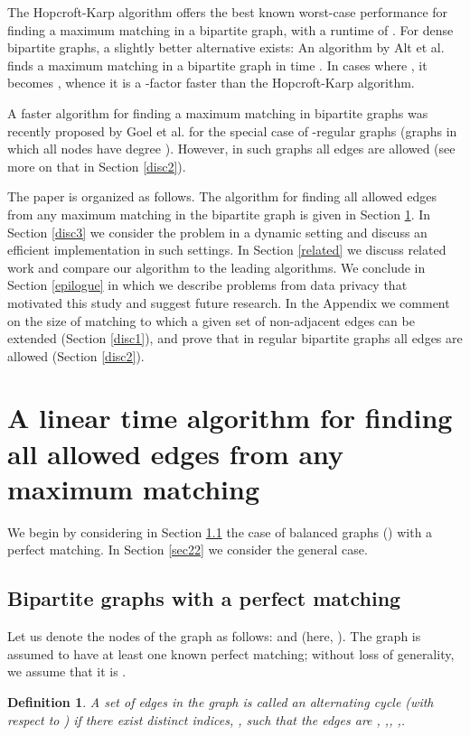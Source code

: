 \documentclass[times, 11pt]{article}
\newtheorem{definition}[theorem]{Definition}
\begin{document}
The Hopcroft-Karp algorithm \cite{HK} offers the best known worst-case performance for finding a maximum matching
in a bipartite graph, with a runtime of .
For dense bipartite graphs, a slightly better alternative exists:
An algorithm by Alt et al. \cite{ABMP} finds a maximum matching in a bipartite graph in time
. In cases where
, it becomes
, whence it is a -factor faster than the Hopcroft-Karp algorithm.

A faster algorithm for finding a maximum matching in bipartite graphs was recently proposed by Goel et al. \cite{GKK10} for the special case
of -regular graphs (graphs in which all nodes have degree ). However, in such graphs all edges are allowed (see more on that in
Section \ref{disc2}).

The paper is organized as follows. The algorithm for finding all allowed edges from any maximum matching in the bipartite graph is given in Section \ref{sec2}.
In Section \ref{disc3} we consider the problem in a dynamic setting and discuss an efficient implementation in such settings.
In Section \ref{related} we discuss related work and compare our algorithm to the leading algorithms. We conclude in Section \ref{epilogue}
in which we describe problems from data privacy that motivated this study and suggest future research.
In the Appendix we comment on the size of matching to which a given set of non-adjacent edges can be extended
(Section \ref{disc1}), and prove
that in regular bipartite graphs all edges are allowed (Section \ref{disc2}).

\section{A linear time algorithm for finding all allowed edges from any maximum matching}\label{sec2}
We begin by considering in Section \ref{sec21}
the case of balanced graphs () with a perfect matching.
In Section \ref{sec22} we consider the general case.

\subsection{Bipartite graphs with a perfect matching}\label{sec21}
Let us denote the nodes of the graph as follows:  and  (here, ).
The graph  is assumed to have at least one known perfect
matching; without loss of generality, we assume that it
is .

\begin{definition}\label{defcyc} A set of  edges in the graph  is called
an {\em alternating cycle} (with respect to )
if there exist  distinct indices, ,
such that the  edges are
, ,, ,.
\end{definition}
\end{document}
